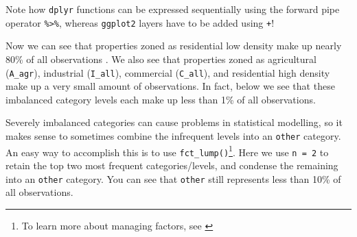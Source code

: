 \documentclass[]{book}
\newenvironment{Shaded}{\begin{snugshade}}{\end{snugshade}}
\newcommand{\DataTypeTok}[1]{\textcolor[rgb]{0.13,0.29,0.53}{#1}}
\newcommand{\KeywordTok}[1]{\textcolor[rgb]{0.13,0.29,0.53}{\textbf{#1}}}
\newcommand{\NormalTok}[1]{#1}
\newcommand{\OperatorTok}[1]{\textcolor[rgb]{0.81,0.36,0.00}{\textbf{#1}}}
\newcommand{\StringTok}[1]{\textcolor[rgb]{0.31,0.60,0.02}{#1}}
\let\rmarkdownfootnote\footnote%
\def\footnote{\protect\rmarkdownfootnote}
\theoremstyle{definition}
\theoremstyle{definition}
\theoremstyle{definition}
\theoremstyle{remark}
\let\BeginKnitrBlock\begin \let\EndKnitrBlock\end
\begin{document}
\BeginKnitrBlock{note}
Note how \texttt{dplyr} functions can be expressed sequentially using
the forward pipe operator \texttt{\%\textgreater{}\%}, whereas
\texttt{ggplot2} layers have to be added using \texttt{+}!
\EndKnitrBlock{note}

Now we can see that properties zoned as residential low density make up
nearly 80\% of all observations . We also see that properties zoned as
agricultural (\texttt{A\_agr}), industrial (\texttt{I\_all}), commercial
(\texttt{C\_all}), and residential high density make up a very small
amount of observations. In fact, below we see that these imbalanced
category levels each make up less than 1\% of all observations.

\begin{Shaded}
\end{Shaded}

Severely imbalanced categories can cause problems in statistical
modelling, so it makes sense to sometimes combine the infrequent levels
into an \texttt{other} category. An easy way to accomplish this is to
use \texttt{fct\_lump()}\footnote{To learn more about managing factors,
  see \citet[ch.~15]{wickham-R-2017}}. Here we use \texttt{n\ =\ 2} to
retain the top two most frequent categories/levels, and condense the
remaining into an \texttt{other} category. You can see that
\texttt{other} still represents less than 10\% of all observations.
\end{document}
